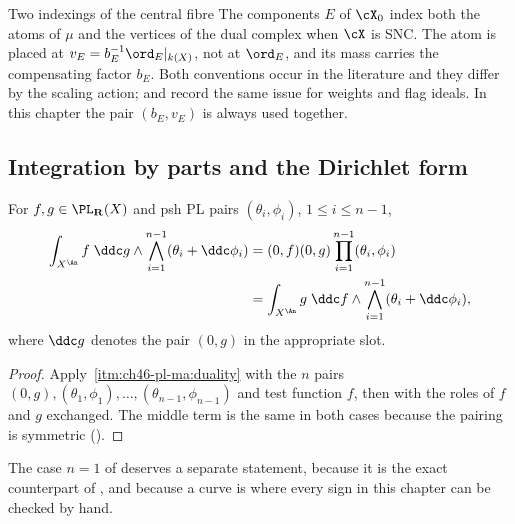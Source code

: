 \begin{warning}{Two indexings of the central fibre}
\label{warn:ch46-two-indexings}
The components $E$ of $\cX_0$ index both the atoms of $\mu$ and the
vertices of the dual complex when $\cX$ is SNC.  The atom is placed at
$v_E=b_E^{-1}\ord_E|_{k(X)}$, not at $\ord_E$, and its mass carries the
compensating factor $b_E$.  Both conventions occur in the literature and
they differ by the scaling action;  and
 record the same issue for weights and flag
ideals.  In this chapter the pair $(b_E,v_E)$ is always used together.
\end{warning}

\subsection{Integration by parts and the Dirichlet form}
\label{sec:ch46-pl-ibp}

\begin{corollary}
\label{cor:ch46-pl-ibp}
For $f,g\in\PL_{\mathbf R}(X)$ and psh PL pairs
$(\theta_i,\phi_i)$, $1\le i\le n-1$,
\[
 \begin{aligned}
  \int_{X^{\An}}f\;\ddc g\wedge
    \bigwedge_{i=1}^{n-1}(\theta_i+\ddc\phi_i)
   &=(0,f)(0,g)\prod_{i=1}^{n-1}(\theta_i,\phi_i)\\
   &=\int_{X^{\An}}g\;\ddc f\wedge
     \bigwedge_{i=1}^{n-1}(\theta_i+\ddc\phi_i),
 \end{aligned}
\]
where $\ddc g$ denotes the pair $(0,g)$ in the appropriate slot.
\end{corollary}

\begin{proof}
Apply \,\cref{itm:ch46-pl-ma:duality} with the
$n$ pairs $(0,g),(\theta_1,\phi_1),\dots,(\theta_{n-1},\phi_{n-1})$ and
test function $f$, then with the roles of $f$ and $g$ exchanged.  The
middle term is the same in both cases because the pairing is symmetric
().
\end{proof}

The case $n=1$ of  deserves a separate statement,
because it is the exact counterpart of
, and because a curve is where every
sign in this chapter can be checked by hand.

